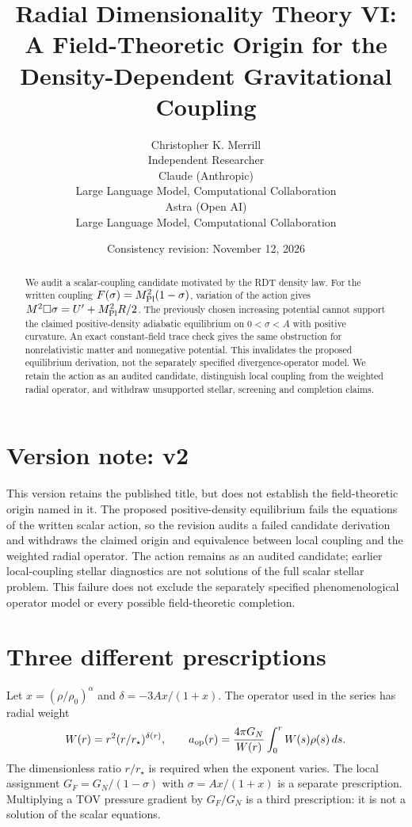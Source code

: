 \documentclass[11pt,a4paper]{article}
\newcommand{\GN}{G_N}
\begin{document}
\title{Radial Dimensionality Theory VI: A Field-Theoretic Origin for the Density-Dependent Gravitational Coupling}
\author{Christopher K. Merrill\\\small Independent Researcher\\[1ex]
Claude (Anthropic)\\\small Large Language Model, Computational Collaboration\\[1ex]
Astra (Open AI)\\\small Large Language Model, Computational Collaboration}
\date{Consistency revision: November 12, 2026}
\maketitle
\begin{abstract}
We audit a scalar-coupling candidate motivated by the RDT density law.
For the written coupling $F(\sigma)=M_{\rm Pl}^2(1-\sigma)$, variation of
the action gives $M^2\Box\sigma=U'+M_{\rm Pl}^2R/2$. The previously chosen
increasing potential cannot support the claimed positive-density adiabatic
equilibrium on $0<\sigma<A$ with positive curvature. An exact constant-field
trace check gives the same obstruction for nonrelativistic matter and
nonnegative potential. This invalidates the proposed equilibrium derivation,
not the separately specified divergence-operator model. We retain the action
as an audited candidate, distinguish local coupling from the weighted radial
operator, and withdraw unsupported stellar, screening and completion claims.
\end{abstract}

\section*{Version note: v2}
This version retains the published title, but does not establish the field-theoretic origin named in it. The proposed positive-density equilibrium fails the equations of the written scalar action, so the revision audits a failed candidate derivation and withdraws the claimed origin and equivalence between local coupling and the weighted radial operator. The action remains as an audited candidate; earlier local-coupling stellar diagnostics are not solutions of the full scalar stellar problem. This failure does not exclude the separately specified phenomenological operator model or every possible field-theoretic completion.


\section{Three different prescriptions}
Let $x=(\rho/\rho_0)^\alpha$ and $\delta=-3Ax/(1+x)$. The operator used in
the series has radial weight
\begin{equation}
 W(r)=r^2(r/r_\star)^{\delta(r)},\qquad
 a_{\rm op}(r)=\frac{4\pi\GN}{W(r)}\int_0^r W(s)\rho(s)\,ds.
\end{equation}
The dimensionless ratio $r/r_\star$ is required when the exponent varies.
The local assignment $G_F=\GN/(1-\sigma)$ with $\sigma=Ax/(1+x)$ is a
separate prescription. Multiplying a TOV pressure gradient by $G_F/\GN$
is a third prescription: it is not a solution of the scalar equations.
\end{document}
